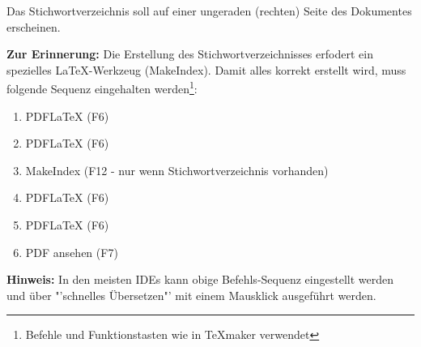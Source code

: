 
Das Stichwortverzeichnis soll auf einer ungeraden (rechten) Seite des Dokumentes erscheinen.

\textbf{Zur Erinnerung:} Die Erstellung des Stichwortverzeichnisses erfodert ein spezielles \LaTeX-Werkzeug (MakeIndex). Damit alles korrekt erstellt wird, muss folgende Sequenz eingehalten werden\footnote{Befehle und Funktionstasten wie in TeXmaker verwendet}:

\begin{enumerate}
\setlength\itemsep{-1em}
\item PDFLaTeX (F6)
\item PDFLaTeX (F6)
\item MakeIndex (F12 - nur wenn Stichwortverzeichnis vorhanden)
\item PDFLaTeX (F6)
\item PDFLaTeX (F6)
\item PDF ansehen (F7)
\end{enumerate}

\textbf{Hinweis:} In den meisten IDEs kann obige Befehls-Sequenz eingestellt werden und über "'schnelles Übersetzen"' mit einem Mausklick ausgeführt werden.
